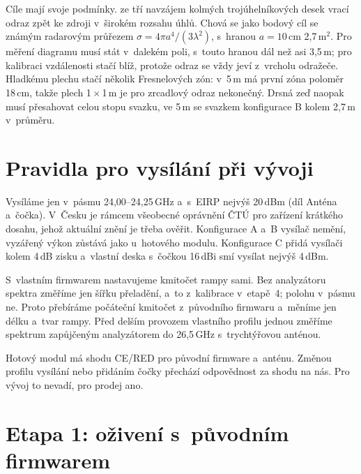 \documentclass[czech]{skyren}
\begin{document}
Cíle mají svoje podmínky.  ze tří navzájem
kolmých trojúhelníkových desek vrací odraz zpět ke zdroji v~širokém rozsahu
úhlů. Chová se jako bodový cíl se známým radarovým průřezem
$\sigma = 4\pi a^4/(3\lambda^2)$, s~hranou $a = 10$\,cm 2,7\,m$^2$. Pro
měření diagramu musí stát v~dalekém poli, s~touto hranou dál než asi
3,5\,m; pro kalibraci vzdálenosti stačí blíž, protože odraz se vždy jeví
z~vrcholu odražeče. Hladkému plechu stačí několik Fresnelových zón: v~5\,m
má první zóna poloměr 18\,cm, takže plech 1\,$\times$\,1\,m je pro zrcadlový
odraz nekonečný. Drsná zeď naopak musí přesahovat celou stopu svazku, ve
5\,m se svazkem konfigurace B kolem 2,7\,m v~průměru.


\section{Pravidla pro vysílání při vývoji}

Vysíláme jen v~pásmu 24,00--24,25\,GHz a~s~EIRP nejvýš 20\,dBm (díl Anténa
a~čočka). V~Česku je rámcem všeobecné oprávnění ČTÚ pro zařízení krátkého
dosahu, jehož aktuální znění je třeba ověřit. Konfigurace A a~B vysílač
nemění, vyzářený výkon zůstává jako u~hotového modulu. Konfigurace C přidá
vysílači kolem 4\,dB zisku a~vlastní deska s~čočkou 16\,dBi smí vysílat
nejvýš 4\,dBm.

S~vlastním firmwarem nastavujeme kmitočet rampy sami. Bez analyzátoru
spektra změříme jen šířku přeladění, a~to z~kalibrace v~etapě~4; polohu
v~pásmu ne. Proto přebíráme počáteční kmitočet z~původního firmwaru
a~měníme jen délku a~tvar rampy. Před delším provozem vlastního profilu
jednou změříme spektrum zapůjčeným analyzátorem do 26,5\,GHz s~trychtýřovou
anténou.

Hotový modul má shodu CE/RED pro původní firmware a~anténu. Změnou profilu
vysílání nebo přidáním čočky přechází odpovědnost za shodu na nás. Pro vývoj
to nevadí, pro prodej ano.

\section{Etapa 1: oživení s~původním firmwarem}
\end{document}
